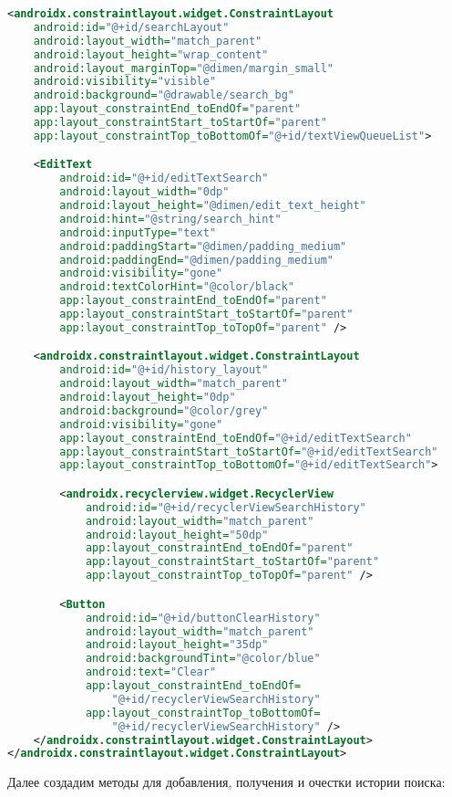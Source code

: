\begin{lstlisting}[language=XML]
<androidx.constraintlayout.widget.ConstraintLayout
	android:id="@+id/searchLayout"
	android:layout_width="match_parent"
	android:layout_height="wrap_content"
	android:layout_marginTop="@dimen/margin_small"
	android:visibility="visible"
	android:background="@drawable/search_bg"
	app:layout_constraintEnd_toEndOf="parent"
	app:layout_constraintStart_toStartOf="parent"
	app:layout_constraintTop_toBottomOf="@+id/textViewQueueList">

	<EditText
		android:id="@+id/editTextSearch"
		android:layout_width="0dp"
		android:layout_height="@dimen/edit_text_height"
		android:hint="@string/search_hint"
		android:inputType="text"
		android:paddingStart="@dimen/padding_medium"
		android:paddingEnd="@dimen/padding_medium"
		android:visibility="gone"
		android:textColorHint="@color/black"
		app:layout_constraintEnd_toEndOf="parent"
		app:layout_constraintStart_toStartOf="parent"
		app:layout_constraintTop_toTopOf="parent" />

	<androidx.constraintlayout.widget.ConstraintLayout
		android:id="@+id/history_layout"
		android:layout_width="match_parent"
		android:layout_height="0dp"
		android:background="@color/grey"
		android:visibility="gone"
		app:layout_constraintEnd_toEndOf="@+id/editTextSearch"
		app:layout_constraintStart_toStartOf="@+id/editTextSearch"
		app:layout_constraintTop_toBottomOf="@+id/editTextSearch">

		<androidx.recyclerview.widget.RecyclerView
			android:id="@+id/recyclerViewSearchHistory"
			android:layout_width="match_parent"
			android:layout_height="50dp"
			app:layout_constraintEnd_toEndOf="parent"
			app:layout_constraintStart_toStartOf="parent"
			app:layout_constraintTop_toTopOf="parent" />

		<Button
			android:id="@+id/buttonClearHistory"
			android:layout_width="match_parent"
			android:layout_height="35dp"
			android:backgroundTint="@color/blue"
			android:text="Clear"
			app:layout_constraintEnd_toEndOf=
				"@+id/recyclerViewSearchHistory"
			app:layout_constraintTop_toBottomOf=
				"@+id/recyclerViewSearchHistory" />
	</androidx.constraintlayout.widget.ConstraintLayout>
</androidx.constraintlayout.widget.ConstraintLayout>
\end{lstlisting}

Далее создадим методы для добавления, получения и очестки истории поиска:


